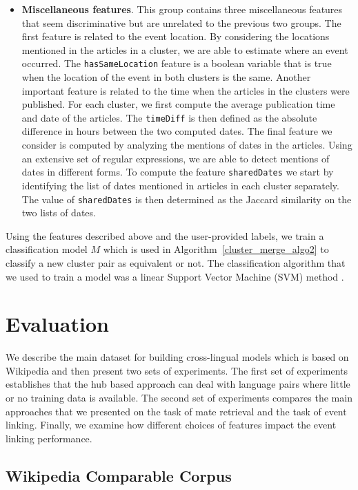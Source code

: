\documentclass[twoside,11pt]{article}
\begin{document}
\begin{itemize}
\item {\bf Miscellaneous features}. This group contains three miscellaneous features that seem discriminative but are unrelated to the previous two groups. The first feature is related to the event location. By considering the locations mentioned in the articles in a cluster, we are able to estimate where an event occurred. The \texttt{hasSameLocation} feature is a boolean variable that is true when the location of the event in both clusters is the same. Another important feature is related to the time when the articles in the clusters were published. For each cluster, we first compute the average publication time and date of the articles. The \texttt{timeDiff} is then defined as the absolute difference in hours between the two computed dates. The final feature we consider is computed by analyzing the mentions of dates in the articles. Using an extensive set of regular expressions, we are able to detect mentions of dates in different forms. To compute the feature \texttt{sharedDates} we start by identifying the list of dates mentioned in articles in each cluster separately. The value of \texttt{sharedDates} is then determined as the Jaccard similarity on the two lists of dates.

\end{itemize}

Using the  features described above and the user-provided labels, we train a classification model $M$ which is used in Algorithm~\ref{cluster_merge_algo2} to classify a new cluster pair as equivalent or not. The classification algorithm that we used to train a model was a linear Support Vector Machine (SVM) method .




\section{Evaluation}

We describe the main dataset for building cross-lingual models which is based on Wikipedia and then present two sets of experiments. The first set of experiments
establishes that the hub based approach can deal with language pairs where little or no training data is available. The second set of experiments compares the main approaches
that we presented on the task of mate retrieval and the task of event linking. Finally, we examine how different choices of features impact the event linking performance.

\subsection{Wikipedia Comparable Corpus}
\end{document}
